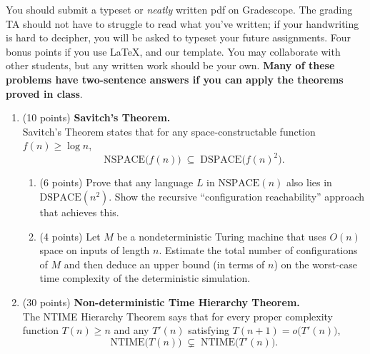 \documentclass[11pt]{article}
\begin{document}

You should submit a typeset or \emph{neatly} written pdf on Gradescope. The grading TA should not have to struggle to read what you've written; if your handwriting is hard to decipher, you will be asked to typeset your future assignments. Four bonus points if you use \LaTeX, and our template. You may collaborate with other students, but any written work should be your own. \textbf{Many of these problems have two-sentence answers if you can apply the theorems proved in class}.

\begin{enumerate}


  \item (10 points) \textbf{Savitch's Theorem.}\\[1mm]
  Savitch's Theorem states that for any space-constructable function \(f(n) \ge \log n\),
  \[
    \text{NSPACE}\bigl(f(n)\bigr) \;\subseteq\; \text{DSPACE}\bigl(f(n)^2\bigr).
  \]
  \begin{enumerate}[label=(\alph*)]
  
    \item (6 points) Prove that any language \(L\) in \(\text{NSPACE}(n)\) also lies in \(\text{DSPACE}(n^2)\). Show the recursive “configuration reachability” approach that achieves this. 
    \\
    \begin{answer}
    \end{answer}
    
    \item (4 points) Let \( M \) be a nondeterministic Turing machine that uses \( O(n) \) space on inputs of length \( n \). Estimate the total number of configurations of \( M \) and then deduce an upper bound (in terms of \( n \)) on the worst-case time complexity of the deterministic simulation.
    
    \begin{answer}
    \end{answer}
    
  \end{enumerate}

  \item (30 points) \textbf{Non-deterministic Time Hierarchy Theorem.}\\[1mm]
  The NTIME Hierarchy Theorem says that for every proper complexity function \(T(n) \ge n\) and any \(T'(n)\) satisfying \(T(n+1)=o\bigl(T'(n)\bigr)\),
  \[
     \text{NTIME}\bigl(T(n)\bigr) \;\subsetneq\; \text{NTIME}\bigl(T'(n)\bigr).
  \]
  

\end{enumerate}
\end{document}
